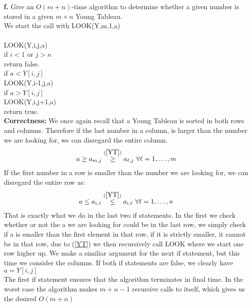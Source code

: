 \documentclass{article}
\theoremstyle{remark}
\numberwithin{equation}{section}
\begin{document}
\\
\\\textbf{f.} Give an $O(m+n)$-time algorithm to determine whether a given number is stored in a given $m \times n$ Young Tableau.
\\
 We start the call with LOOK(Y,m,1,a)\\
\\LOOK(Y,i,j,a) 
\\if $i<1$ or $j>n$
\\\indent return false.
\\if $a < Y[i,j]$\\
\indent LOOK(Y,i-1,j,a)\\
if $a > Y[i,j] $\\
\indent LOOK(Y,i,j+1,a)\\
return true. \\
\textbf{Correctness:} We once again recall that a Young Tableau is sorted in both rows and columns. Therefore if the last number in a column, is larger than the number we are looking for, we can disregard the entire column.
\begin{align*}
	a\geq a_{m,j}\stackrel{(\ref{YT})}{\geq} a_{\ell,j} \text{ } \forall \ell=1,\dots,m
\end{align*}
 If the first number in a row is smaller than the number we are looking for, we can disregard the entire row as: 
 \begin{align*}
 a\leq a_{i,1}\stackrel{(\ref{YT})}{\leq} a_{i,\ell} \text{ } \forall \ell=1,\dots,n
 \end{align*}
 That is exactly what we do in the last two if statements. In the first we check whether or not the a we are looking for could be in the last row, we simply check if a is smaller than the first element in that row, if it is strictly smaller, it cannot be in that row, due to (\ref{YT}) we then recursively call LOOK where we start one row higher up. 
 We make a similiar argument for the next if statement, but this time we consider the columns. If both if statements are false, we clearly have $a = Y[i,j]$\\
 The first if statement ensures that the algorithm terminates in final time. In the worst case the algorithm makes $m+n-1$ recursive calls to itself, which gives us the desired $O(m+n)$

 
 
 

 






	
\end{document}
